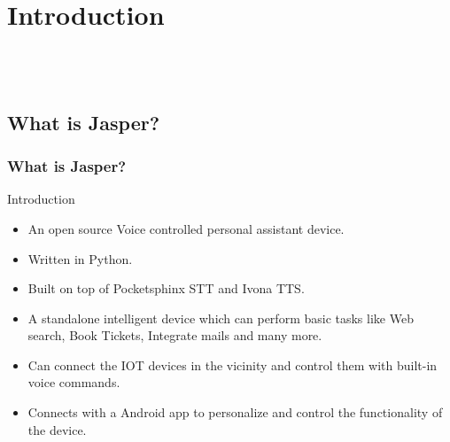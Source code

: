 \documentclass[xcolor=dvipsnames]{beamer}
\begin{document}
\section{Introduction}
\begin{frame}
\begin{center}
\\
\vspace{0.5cm}
\\
\vspace{0.5cm}
\end{center}
\end{frame}


\subsection{What is Jasper?}
\begin{frame}[fragile] %
\frametitle{What is Jasper?}
\begin{exampleblock}{Introduction}
\begin{itemize}
\item An open source Voice controlled personal assistant device.
\item Written in Python.
\item Built on top of Pocketsphinx STT and Ivona TTS.
\item A standalone intelligent device which can perform basic tasks like Web search, Book Tickets, Integrate mails and many more.
\item Can connect the IOT devices in the vicinity and control them with built-in  voice commands.
\item Connects with a Android app to personalize and control the functionality of the device.
\end{itemize}
\end{exampleblock}
\end{frame}
\end{document}
